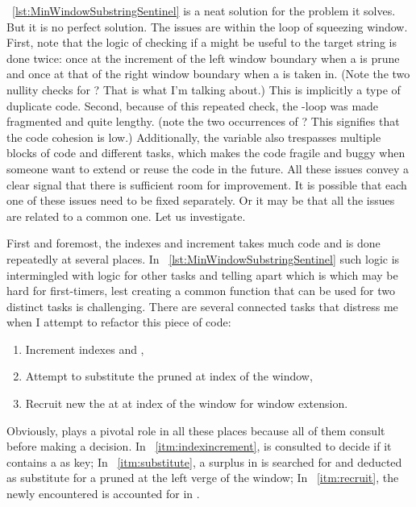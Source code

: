 ~\autoref{lst:MinWindowSubstringSentinel} is a neat solution for the problem it solves.
But it is no perfect solution.
The issues are within the loop of squeezing window.
First, note that the logic of checking if a  might be useful to
the target string is done twice: once at the increment of the left window boundary when a  is
prune and once at that of the right window boundary when a  is taken in.
(Note the two nullity checks for ? That is what I'm talking about.)
This is implicitly a type of duplicate code.
Second, because of this repeated check, the -loop was made fragmented and quite lengthy.
(note the two occurrences of ? This signifies that the code cohesion is low.)
Additionally, the variable  also trespasses multiple blocks of code and different tasks,
which makes the code fragile and buggy when someone want to extend or reuse the code in the future.
All these issues convey a clear signal that there is sufficient room for improvement.
It is possible that each one of these issues need to be fixed separately.
Or it may be that all the issues are related to a common one.
Let us investigate.

First and foremost, the indexes  and  increment takes much code and is
done repeatedly at several places.
In ~\autoref{lst:MinWindowSubstringSentinel} such logic is intermingled with logic for other
tasks and telling apart which is which may be hard for first-timers, lest creating a common
function that can be used for two distinct tasks is challenging.
There are several connected tasks that distress me when I attempt to refactor this piece of code:
\begin{enumerate}[label={Task \arabic*}]
    \item\label{itm:indexincrement} Increment indexes  and ,
    \item\label{itm:substitute} Attempt to substitute the pruned  at index  of
    the window,
    \item\label{itm:recruit} Recruit new the  at at index  of
    the window for window extension.
\end{enumerate}
Obviously,  plays a pivotal role in all these places because all of them consult
 before making a decision.
In ~\ref{itm:indexincrement},  is consulted to decide if it contains a  as key;
In ~\ref{itm:substitute}, a surplus in  is searched for and deducted as substitute
for a pruned  at the left verge of the window;
In ~\ref{itm:recruit}, the newly encountered  is accounted for in .

